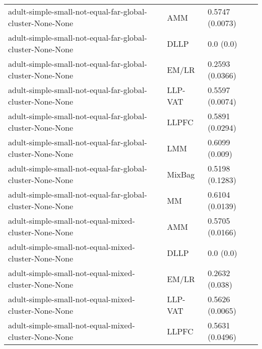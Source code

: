 \begin{longtable}{lll}
                                                    adult-simple-small-not-equal-far-global-cluster-None-None &       AMM &                       0.5747 (0.0073) \\
                                                    adult-simple-small-not-equal-far-global-cluster-None-None &      DLLP &                             0.0 (0.0) \\
                                                    adult-simple-small-not-equal-far-global-cluster-None-None &     EM/LR &                       0.2593 (0.0366) \\
                                                    adult-simple-small-not-equal-far-global-cluster-None-None &   LLP-VAT &                       0.5597 (0.0074) \\
                                                    adult-simple-small-not-equal-far-global-cluster-None-None &     LLPFC &                       0.5891 (0.0294) \\
                                                    adult-simple-small-not-equal-far-global-cluster-None-None &       LMM &                        0.6099 (0.009) \\
                                                    adult-simple-small-not-equal-far-global-cluster-None-None &    MixBag &                       0.5198 (0.1283) \\
                                                    adult-simple-small-not-equal-far-global-cluster-None-None &        MM &                       0.6104 (0.0139) \\
                                                         adult-simple-small-not-equal-mixed-cluster-None-None &       AMM &                       0.5705 (0.0166) \\
                                                         adult-simple-small-not-equal-mixed-cluster-None-None &      DLLP &                             0.0 (0.0) \\
                                                         adult-simple-small-not-equal-mixed-cluster-None-None &     EM/LR &                        0.2632 (0.038) \\
                                                         adult-simple-small-not-equal-mixed-cluster-None-None &   LLP-VAT &                       0.5626 (0.0065) \\
                                                         adult-simple-small-not-equal-mixed-cluster-None-None &     LLPFC &                       0.5631 (0.0496) \\

\end{longtable}
